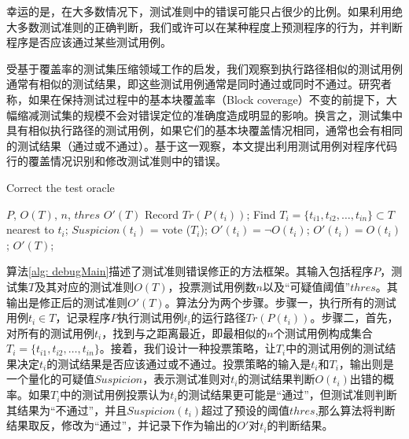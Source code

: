 幸运的是，在大多数情况下，测试准则中的错误可能只占很少的比例。如果利用绝大多数测试准则的正确判断，我们或许可以在某种程度上预测程序的行为，并判断程序是否应该通过某些测试用例。

受基于覆盖率的测试集压缩领域工作\cite{wong1995effect}\cite{wong1999test}的启发，我们观察到执行路径相似的测试用例通常有相似的测试结果，即这些测试用例通常是同时通过或同时不通过。研究者称，如果在保持测试过程中的基本块覆盖率（Block coverage）不变的前提下，大幅缩减测试集的规模不会对错误定位的准确度造成明显的影响。换言之，测试集中具有相似执行路径的测试用例，如果它们的基本块覆盖情况相同，通常也会有相同的测试结果（通过或不通过）。基于这一观察，本文提出利用测试用例对程序代码行的覆盖情况识别和修改测试准则中的错误。

\begin{algorithm}
	\caption{Correct the test oracle}
	\label{alg: debugMain}
	\begin{algorithmic}[1]
		\renewcommand{\algorithmicrequire}{\textbf{Input:}}
		\renewcommand\algorithmicensure {\textbf{Output:} }
		\REQUIRE $P$, $O(T)$, $n$, $thres$
		\ENSURE $O'(T)$
		\STATE Record $Tr(P(t_i))$;
		\ENDFOR
		\STATE Find $T_i = \{t_{i1}, t_{i2}, \ldots, t_{in}\} \subset T$ nearest to $t_i$;
		\STATE $Suspicion(t_i)$ = vote ($T_i$);
		\STATE $O'(t_i) = \neg O(t_i)$;
		\ELSE
		\STATE $O'(t_i) = O(t_i)$;
		\ENDIF
		\ENDFOR
		\RETURN $O'(T)$;
		
	\end{algorithmic}
\end{algorithm}

算法\ref{alg: debugMain}描述了测试准则错误修正的方法框架。其输入包括程序$P$，测试集$T$及其对应的测试准则$O(T)$，投票测试用例数$n$以及“可疑值阈值”$thres$。其输出是修正后的测试准则$O'(T)$。算法分为两个步骤。步骤一，执行所有的测试用例$t_i \in T$，记录程序$P$执行测试用例$t_i$的运行路径$Tr(P(t_i))$。步骤二，首先，对所有的测试用例$t_i$，找到与之距离最近，即最相似的$n$个测试用例构成集合$T_i = \{t_{i1}, t_{i2}, \ldots, t_{in}\}$。接着，我们设计一种投票策略，让$T_i$中的测试用例的测试结果决定$t_i$的测试结果是否应该通过或不通过。投票策略的输入是$t_i$和$T_i$，输出则是一个量化的可疑值$Suspicion$，表示测试准则对$t_i$的测试结果判断$O(t_i)$出错的概率。如果$T_i$中的测试用例投票认为$t_i$的测试结果更可能是“通过”，但测试准则判断其结果为“不通过”，并且$Suspicion(t_i)$超过了预设的阈值$thres$,那么算法将判断结果取反，修改为“通过”，并记录下作为输出的$O'$对$t_i$的判断结果。

